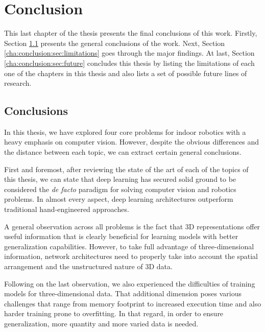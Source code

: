 \chapter{Conclusion}
\label{cha:conclusion}

\begin{chapterabstract}
This last chapter of the thesis presents the final conclusions of this work. Firstly, Section \ref{cha:conclusion:sec:findings} presents the general conclusions of the work. Next, Section \ref{cha:conclusion:sec:limitations} goes through the major findings. At last, Section \ref{cha:conclusion:sec:future} concludes this thesis by listing the limitations of each one of the chapters in this thesis and also lists a set of possible future lines of research.
\end{chapterabstract}

\minitoc

\clearpage

\section{Conclusions}
\label{cha:conclusion:sec:findings}

In this thesis, we have explored four core problems for indoor robotics with a heavy emphasis on computer vision. However, despite the obvious differences and the distance between each topic, we can extract certain general conclusions.

First and foremost, after reviewing the state of the art of each of the topics of this thesis, we can state that deep learning has secured solid ground to be considered the \emph{de facto} paradigm for solving computer vision and robotics problems. In almost every aspect, deep learning architectures outperform traditional hand-engineered approaches.

A general observation across all problems is the fact that \ac{3D} representations offer useful information that is clearly beneficial for learning models with better generalization capabilities. However, to take full advantage of three-dimensional information, network architectures need to properly take into account the spatial arrangement and the unstructured nature of \ac{3D} data.

Following on the last observation, we also experienced the difficulties of training models for three-dimensional data. That additional dimension poses various challenges that range from memory footprint to increased execution time and also harder training prone to overfitting. In that regard, in order to ensure generalization, more quantity and more varied data is needed.


